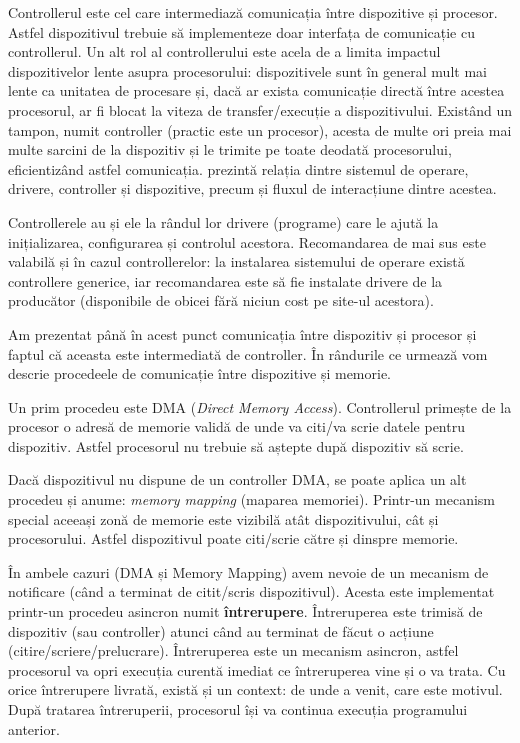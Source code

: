 Controllerul este cel care intermediază comunicația între dispozitive și procesor.
Astfel dispozitivul trebuie să implementeze doar interfața de comunicație cu controllerul.
Un alt rol al controllerului este acela de a limita impactul dispozitivelor lente asupra procesorului: dispozitivele sunt în general mult mai lente ca unitatea de procesare și, dacă ar exista comunicație directă între acestea procesorul, ar fi blocat la viteza de transfer/execuție a dispozitivului.
 Existând un tampon, numit controller (practic este un procesor), acesta de multe ori preia mai multe sarcini de la dispozitiv și le trimite pe toate deodată procesorului, eficientizând astfel comunicația.
 prezintă relația dintre sistemul de operare, drivere, controller și dispozitive, precum și fluxul de interacțiune dintre acestea.

Controllerele au și ele la rândul lor drivere (programe) care le ajută la inițializarea, configurarea și controlul acestora.
Recomandarea de mai sus este valabilă și în cazul controllerelor: la instalarea sistemului de operare există controllere generice, iar recomandarea este să fie instalate drivere de la producător (disponibile de obicei fără niciun cost pe site-ul acestora).

Am prezentat până în acest punct comunicația între dispozitiv și procesor și faptul că aceasta este intermediată de controller.
În rândurile ce urmează vom descrie procedeele de comunicație între dispozitive și memorie.

Un prim procedeu este DMA  (\textit{Direct Memory Access}).
Controllerul primește de la procesor o adresă de memorie validă de unde va citi/va scrie datele pentru dispozitiv.
Astfel procesorul nu trebuie să aștepte după dispozitiv să scrie.

Dacă dispozitivul nu dispune de un controller DMA, se poate aplica un alt procedeu și anume: \textit{memory mapping} (maparea memoriei).
Printr-un mecanism special aceeași zonă de memorie este vizibilă atât dispozitivului, cât și procesorului.
Astfel dispozitivul poate citi/scrie către și dinspre memorie.

În ambele cazuri (DMA și Memory Mapping) avem nevoie de un mecanism de notificare (când a terminat de citit/scris dispozitivul).
Acesta este implementat printr-un procedeu asincron numit \textbf{întrerupere}.
 Întreruperea este trimisă de dispozitiv (sau controller) atunci când au terminat de făcut o acțiune (citire/scriere/prelucrare).
Întreruperea este un mecanism asincron, astfel procesorul va opri execuția curentă imediat ce întreruperea vine și o va trata.
Cu orice întrerupere livrată, există și un context: de unde a venit, care este motivul.
După tratarea întreruperii, procesorul își va continua execuția programului anterior.

